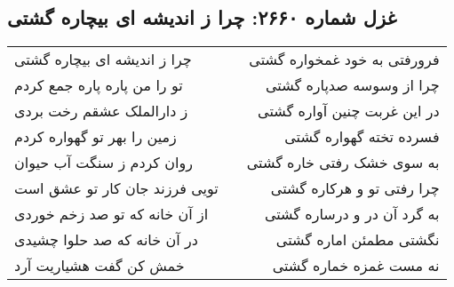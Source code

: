 \begin{center}
\section*{غزل شماره ۲۶۶۰: چرا ز اندیشه ای بیچاره گشتی}
\label{sec:2660}
\begin{longtable}{l p{0.5cm} r}
چرا ز اندیشه ای بیچاره گشتی
&&
فرورفتی به خود غمخواره گشتی
\\
تو را من پاره پاره جمع کردم
&&
چرا از وسوسه صدپاره گشتی
\\
ز دارالملک عشقم رخت بردی
&&
در این غربت چنین آواره گشتی
\\
زمین را بهر تو گهواره کردم
&&
فسرده تخته گهواره گشتی
\\
روان کردم ز سنگت آب حیوان
&&
به سوی خشک رفتی خاره گشتی
\\
تویی فرزند جان کار تو عشق است
&&
چرا رفتی تو و هرکاره گشتی
\\
از آن خانه که تو صد زخم خوردی
&&
به گرد آن در و درساره گشتی
\\
در آن خانه که صد حلوا چشیدی
&&
نگشتی مطمئن اماره گشتی
\\
خمش کن گفت هشیاریت آرد
&&
نه مست غمزه خماره گشتی
\\
\end{longtable}
\end{center}

